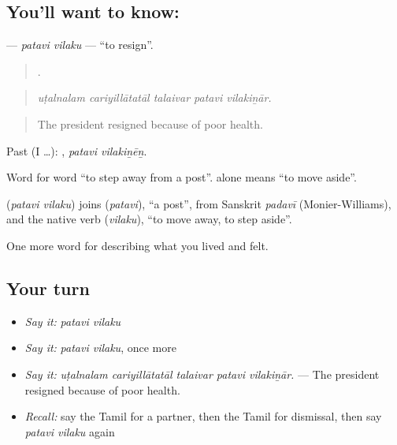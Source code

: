 \subsection*{You'll want to know:  }
\textbf{ } — \emph{patavi vilaku} — \textquotedblleft{}to resign\textquotedblright{}.

\begin{quote}
    .
\end{quote}

\begin{quote}
\emph{uṭalnalam cariyillātatāl talaivar patavi vilakiṉār.}
\end{quote}

\begin{quote}
The president resigned because of poor health.
\end{quote}

Past (I …):  , \emph{patavi vilakiṉēṉ}.

Word for word \textquotedblleft{}to step away from a post\textquotedblright{}.  alone means \textquotedblleft{}to move aside\textquotedblright{}.

\begin{cousinweb}
\textbf{ } (\emph{patavi vilaku}) joins  (\emph{patavi}), \textquotedblleft{}a post\textquotedblright{}, from Sanskrit \emph{padavī} (Monier-Williams), and the native verb  (\emph{vilaku}), \textquotedblleft{}to move away, to step aside\textquotedblright{}.
\end{cousinweb}

\begin{grammarlens}[title={What you've built}]
One more word for describing what you lived and felt.
\end{grammarlens}

\subsection*{Your turn}
\begin{itemize}
\raggedright
  \item \emph{Say it:} \emph{patavi vilaku}
  \item \emph{Say it:} \emph{patavi vilaku}, once more
  \item \emph{Say it:} \emph{uṭalnalam cariyillātatāl talaivar patavi vilakiṉār.} — The president resigned because of poor health.
  \item \emph{Recall:} say the Tamil for a partner, then the Tamil for dismissal, then say \emph{patavi vilaku} again
\end{itemize}

